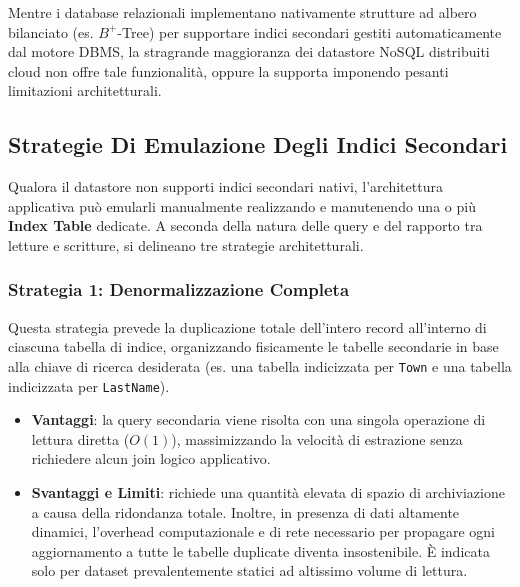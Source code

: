 \documentclass[11pt, a4paper]{article}
\begin{document}
Mentre i database relazionali implementano nativamente strutture ad albero bilanciato (es. $B^+$-Tree) per supportare indici secondari gestiti automaticamente dal motore DBMS, la stragrande maggioranza dei datastore NoSQL distribuiti cloud non offre tale funzionalità, oppure la supporta imponendo pesanti limitazioni architetturali.

\subsection{Strategie Di Emulazione Degli Indici Secondari}

Qualora il datastore non supporti indici secondari nativi, l'architettura applicativa può emularli manualmente realizzando e manutenendo una o più \textbf{Index Table} dedicate. A seconda della natura delle query e del rapporto tra letture e scritture, si delineano tre strategie architetturali.

\subsubsection{Strategia 1: Denormalizzazione Completa}

Questa strategia prevede la duplicazione totale dell'intero record all'interno di ciascuna tabella di indice, organizzando fisicamente le tabelle secondarie in base alla chiave di ricerca desiderata (es. una tabella indicizzata per \texttt{Town} e una tabella indicizzata per \texttt{LastName}).


\begin{itemize}[noitemsep]
    \item \textbf{Vantaggi}: la query secondaria viene risolta con una singola operazione di lettura diretta ($O(1)$), massimizzando la velocità di estrazione senza richiedere alcun join logico applicativo.
    \item \textbf{Svantaggi e Limiti}: richiede una quantità elevata di spazio di archiviazione a causa della ridondanza totale. Inoltre, in presenza di dati altamente dinamici, l'overhead computazionale e di rete necessario per propagare ogni aggiornamento a tutte le tabelle duplicate diventa insostenibile. È indicata solo per dataset prevalentemente statici ad altissimo volume di lettura.
\end{itemize}
\end{document}
